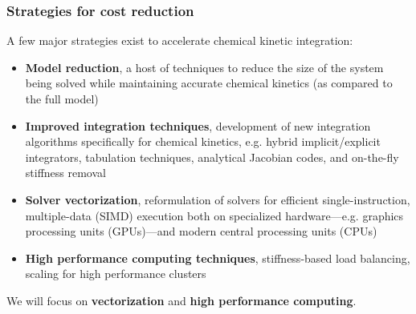 \documentclass{beamer}
\begin{document}
\begin{frame}
 \frametitle{Strategies for cost reduction}
 A few major strategies exist to accelerate chemical kinetic integration:
 \begin{itemize}
  \item \textbf{Model reduction}, a host of techniques to reduce the size of the system being solved while maintaining accurate chemical kinetics (as compared to the full model)
  \item \textbf{Improved integration techniques}, development of new integration algorithms specifically for chemical kinetics, e.g. hybrid implicit\slash explicit integrators, tabulation techniques, analytical Jacobian codes, and on-the-fly stiffness removal
  \item \textbf{Solver vectorization}, reformulation of solvers for efficient single-instruction, multiple-data (SIMD) execution both on specialized hardware---e.g. graphics processing units (GPUs)---and modern central processing units (CPUs)
  \item \textbf{High performance computing techniques}, stiffness-based load balancing, scaling for high performance clusters
 \end{itemize}
 We will focus on \textbf{vectorization} and \textbf{high performance computing}.
\end{frame}
\end{document}
